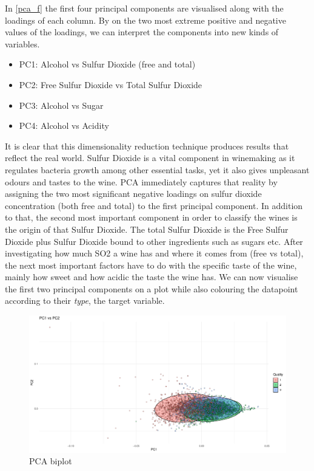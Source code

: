 \documentclass[11pt,twoside]{article}
\numberwithin{Theorem}{section}
\numberwithin{Definition}{section}
\numberwithin{Lemma}{section}
\numberwithin{Algorithm}{section}
\numberwithin{equation}{section}
\begin{document}
\label{fig:pca_f}
\vspace{2em}
In \autoref{pca_f} the first four principal components are visualised along with the loadings of each column. By on the two most extreme positive and negative values of the loadings, we can interpret the components into new kinds of variables.
\begin{itemize}
\item PC1: Alcohol vs Sulfur Dioxide (free and total)
\item PC2: Free Sulfur Dioxide vs Total Sulfur Dioxide
\item PC3: Alcohol vs Sugar
\item PC4: Alcohol vs Acidity
\end{itemize}
It is clear that this dimensionality reduction technique produces results that reflect the real world. Sulfur Dioxide is a vital component in winemaking as it regulates bacteria growth among other essential tasks, yet it also gives unpleasant odours and tastes to the wine. PCA immediately captures that reality by assigning the two most significant negative loadings on sulfur dioxide concentration (both free and total) to the first principal component. In addition to that, the second most important component in order to classify the wines is the origin of that Sulfur Dioxide. The total Sulfur Dioxide is the Free Sulfur Dioxide plus Sulfur Dioxide bound to other ingredients such as sugars etc. After investigating how much SO2 a wine has and where it comes from (free vs total), the next most important factors have to do with the specific taste of the wine, mainly how sweet and how acidic the taste the wine has.
We can now visualise the first two principal components on a plot while also colouring the datapoint according to their \textit{type}, the target variable.
\vspace*{1em}
\begin{figure}[!h]
\centering
\includegraphics[width=\textwidth]{./output/1.c.pca-biplot.pdf}
\caption{PCA biplot}
\label{fig:pca_biplot}
\end{figure}
\end{document}
